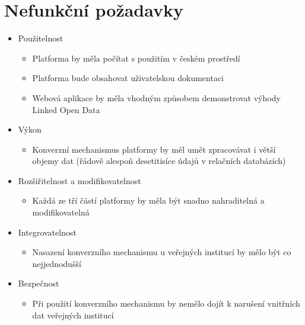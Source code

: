 \newpage

\section{Nefunkční požadavky}

\begin{itemize}
\item Použitelnost
	\begin{itemize}
	\item Platforma by měla počítat s použitím v českém prostředí
	\item Platforma bude obsahovat uživatelskou dokumentaci
	\item Webová aplikace by měla vhodným způsobem demonstrovat výhody Linked Open Data
	\end{itemize}
\item Výkon
	\begin{itemize}
	\item Konverzní mechanismus platformy by měl umět zpracovávat i větší objemy dat (řádově alespoň desetitisíce údajů v relačních databázích)
	\end{itemize}
\item Rozšiřitelnost a modifikovatelnost
	\begin{itemize}
	\item Každá ze tří částí platformy by měla být snadno nahraditelná a modifikovatelná
	\end{itemize}
\item Integrovatelnost
	\begin{itemize}
	\item Nasazení konverzního mechanismu u veřejných institucí by mělo být co nejjednodušší
	\end{itemize}
\item Bezpečnost
	\begin{itemize}
	\item Při použití konverzního mechanismu by nemělo dojít k narušení vnitřních dat veřejných institucí	
	\end{itemize}
\end{itemize}
